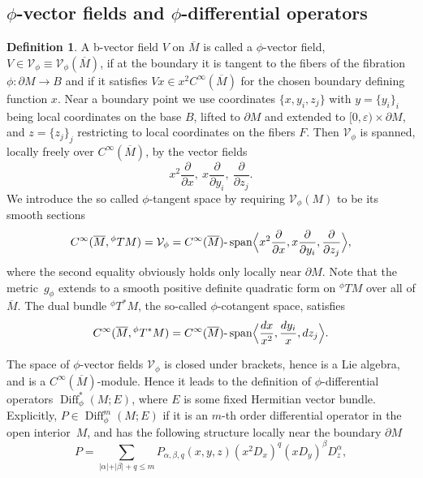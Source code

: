 \documentclass[11pt]{article}
\newcommand{\Subsection}{\subsection}
\numberwithin{equation}{section}
\theoremstyle{plain}
\theoremstyle{definition}
\newtheorem{defn}[Th]{Definition}
\newcommand\calV{{\mathcal V}}
\DeclareMathOperator{\Diff}{Diff}
\DeclareMathOperator{\Span}{span}
\newcommand{\Cinf}{C^\infty}
\newcommand{\phiT}{{}^\phi T}
\newcommand{\Mbar}{{\overline{M}}}\let\M\Mbar
\begin{document}
\Subsection{\texorpdfstring{$\phi$}{phi}-vector fields and $\phi$-differential operators}
\begin{defn}\label{Phi-vector-def}
A b-vector field $V$ on $\Mbar$ is called a $\phi$-vector field, $V\in\mathcal{V}_{\phi}\equiv \mathcal{V}_{\phi}(\M)$, if at the boundary it is tangent to the fibers of the fibration
$\phi: \partial M \to B$ and if it satisfies $Vx \in x^{2}C^{\infty}(\Mbar)$ for the chosen boundary defining function $x$. Near a boundary point we use coordinates
$\{x,y_i,z_j\}$ with $y = \{y_i\}_i$
being local coordinates on the base $B$, lifted to $\partial M$ and extended to
$[0,\varepsilon) \times \partial M$, and $z=\{z_j\}_j$ restricting to local coordinates on the fibers $F$. Then $\calV_\phi$ is spanned, locally freely over $\Cinf(\Mbar)$, by the vector fields
\[
x^{2}\frac{\partial}{\partial x},\ x\frac{\partial}{\partial y_{i}},\ \frac{\partial}{\partial z_{j}}.
\]
We introduce the so called $\phi$-tangent space by requiring $\mathcal{V}_{\phi}(M)$
to be its smooth sections
\begin{equation*}
C^\infty(\Mbar, {}^\phi TM) = \mathcal{V}_{\phi}
= C^\infty(\Mbar)\text{-}\Span\Bigl\langle x^{2}\frac{\partial}{\partial x},
x\frac{\partial}{\partial y_{i}}, \frac{\partial}{\partial z_{j}}\Bigr\rangle,
\end{equation*}
where the second equality obviously holds only locally near $\partial M$.
Note that the metric~$g_\phi$ extends to a smooth positive definite quadratic form on $\phiT M$ over all of $\Mbar$.
The dual bundle $\phiT^{*} M$, the so-called $\phi$-cotangent space, satisfies
\begin{equation*}
C^\infty(\Mbar, {}^\phi T^*M) =
C^\infty(\Mbar)\text{-}\Span\Bigl\langle \frac{dx}{x^{2}}, \frac{dy_{i}}{x},dz_{j}\Bigr\rangle.
\end{equation*}
\end{defn}
The space of $\phi$-vector fields $\mathcal{V}_{\phi}$ is closed under brackets, hence is a Lie algebra,
and is a $C^{\infty}(\Mbar)$-module. Hence it leads to the definition of
$\phi$-differential opera\-tors $\Diff_{\phi}^{*}(M; E)$, where $E$ is some fixed Hermitian vector bundle.
Explicitly, \hbox{$P \in \Diff_{\phi}^{m}(M; E)$} if it is an $m$-th order differential operator
in the open interior~$M$, and has the following structure locally near
the boundary $\partial M$
\begin{equation}\label{diff-phi}
P = \sum_{\vert \alpha \vert + \vert \beta \vert + q \leq m}
P_{\alpha,\beta,q}(x,y,z)(x^{2}D_{x})^{q}(xD_{y})^\beta D_{z}^{\alpha},
\end{equation}
\end{document}
